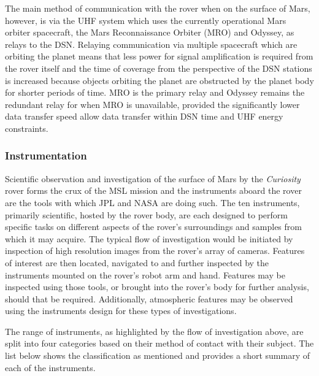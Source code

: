         The main method of communication with the rover when on the surface of Mars, however, is via the UHF system which uses the currently operational Mars orbiter spacecraft, the Mars Reconnaissance Orbiter (MRO) and Odyssey, as relays to the DSN. Relaying communication via multiple spacecraft which are orbiting the planet means that less power for signal amplification is required from the rover itself and the time of coverage from the perspective of the DSN stations is increased because objects orbiting the planet are obstructed by the planet body for shorter periods of time. MRO is the primary relay and Odyssey remains the redundant relay for when MRO is unavailable, provided the significantly lower data transfer speed allow data transfer within DSN time and UHF energy constraints.
        
      \subsubsection{Instrumentation}
        Scientific observation and investigation of the surface of Mars by the \textit{Curiosity} rover forms the crux of the MSL mission and the instruments aboard the rover are the tools with which JPL and NASA are doing such. The ten instruments, primarily scientific, hosted by the rover body, are each designed to perform specific tasks on different aspects of the rover's surroundings and samples from which it may acquire. The typical flow of investigation would be initiated by inspection of high resolution images from the rover's array of cameras. Features of interest are then located, navigated to and further inspected by the instruments mounted on the rover's robot arm and hand. Features may be inspected using those tools, or brought into the rover's body for further analysis, should that be required. Additionally, atmospheric features may be observed using the instruments design for these types of investigations.
        
        The range of instruments, as highlighted by the flow of investigation above, are split into four categories based on their method of contact with their subject. The list below shows the classification as mentioned and provides a short summary of each of the instruments.
        
